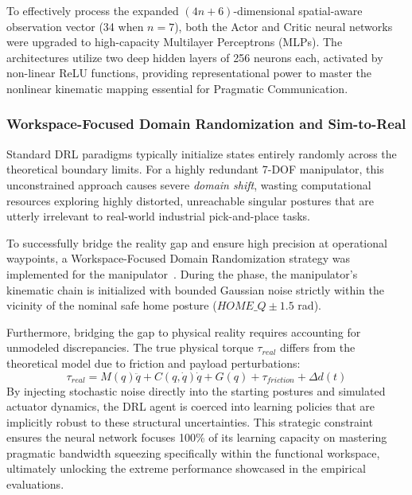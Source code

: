 To effectively process the expanded $(4n+6)$-dimensional spatial-aware observation vector (34 when $n=7$), both the Actor and Critic neural networks were upgraded to high-capacity Multilayer Perceptrons (MLPs). The architectures utilize two deep hidden layers of 256 neurons each, activated by non-linear ReLU functions, providing representational power to master the nonlinear kinematic mapping essential for Pragmatic Communication.

\subsubsection{Workspace-Focused Domain Randomization and Sim-to-Real}
Standard DRL paradigms typically initialize states entirely randomly across the theoretical boundary limits. For a highly redundant 7-DOF manipulator, this unconstrained approach causes severe \textit{domain shift}, wasting computational resources exploring highly distorted, unreachable singular postures that are utterly irrelevant to real-world industrial pick-and-place tasks.

To successfully bridge the reality gap and ensure high precision at operational waypoints, a Workspace-Focused Domain Randomization strategy was implemented for the manipulator~\cite{DRTDN,SRTRC}. During the  phase, the manipulator's kinematic chain is initialized with bounded Gaussian noise strictly within the vicinity of the nominal safe home posture ($HOME\_Q \pm 1.5$ rad). 

Furthermore, bridging the gap to physical reality requires accounting for unmodeled discrepancies. The true physical torque $\tau_{real}$ differs from the theoretical model due to friction and payload perturbations:
\begin{equation}
    \tau_{real} = M(q)\ddot{q} + C(q,\dot{q})\dot{q} + G(q) + \tau_{friction} + \Delta d(t)
\end{equation}
By injecting stochastic noise directly into the starting postures and simulated actuator dynamics, the DRL agent is coerced into learning policies that are implicitly robust to these structural uncertainties. This strategic constraint ensures the neural network focuses 100\% of its learning capacity on mastering pragmatic bandwidth squeezing specifically within the functional workspace, ultimately unlocking the extreme performance showcased in the empirical evaluations.
